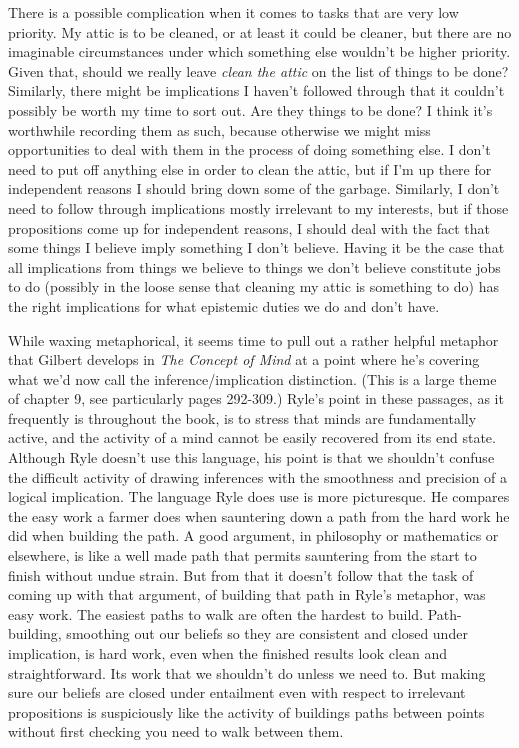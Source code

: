 There is a possible complication when it comes to tasks that are very low priority. My attic is to be cleaned, or at least it could be cleaner, but there are no imaginable circumstances under which something else wouldn't be higher priority. Given that, should we really leave \textit{clean the attic} on the list of things to be done? Similarly, there might be implications I haven't followed through that it couldn't possibly be worth my time to sort out. Are they things to be done? I think it's worthwhile recording them as such, because otherwise we might miss opportunities to deal with them in the process of doing something else. I don't need to put off anything else in order to clean the attic, but if I'm up there for independent reasons I should bring down some of the garbage. Similarly, I don't need to follow through implications mostly irrelevant to my interests, but if those propositions come up for independent reasons, I should deal with the fact that some things I believe imply something I don't believe. Having it be the case that all implications from things we believe to things we don't believe constitute jobs to do (possibly in the loose sense that cleaning my attic is something to do) has the right implications for what epistemic duties we do and don't have.

While waxing metaphorical, it seems time to pull out a rather helpful metaphor that Gilbert \citeauthor{Ryle1949} develops in \textit{The Concept of Mind} at a point where he's covering what we'd now call the inference/implication distinction. (This is a large theme of chapter 9, see particularly pages 292-309.) Ryle's point in these passages, as it frequently is throughout the book, is to stress that minds are fundamentally active, and the activity of a mind cannot be easily recovered from its end state. Although Ryle doesn't use this language, his point is that we shouldn't confuse the difficult activity of drawing inferences with the smoothness and precision of a logical implication. The language Ryle does use is more picturesque. He compares the easy work a farmer does when sauntering down a path from the hard work he did when building the path. A good argument, in philosophy or mathematics or elsewhere, is like a well made path that permits sauntering from the start to finish without undue strain. But from that it doesn't follow that the task of coming up with that argument, of building that path in Ryle's metaphor, was easy work. The easiest paths to walk are often the hardest to build. Path-building, smoothing out our beliefs so they are consistent and closed under implication, is hard work, even when the finished results look clean and straightforward. Its work that we shouldn't do unless we need to. But making sure our beliefs are closed under entailment even with respect to irrelevant propositions is suspiciously like the activity of buildings paths between points without first checking you need to walk between them.

